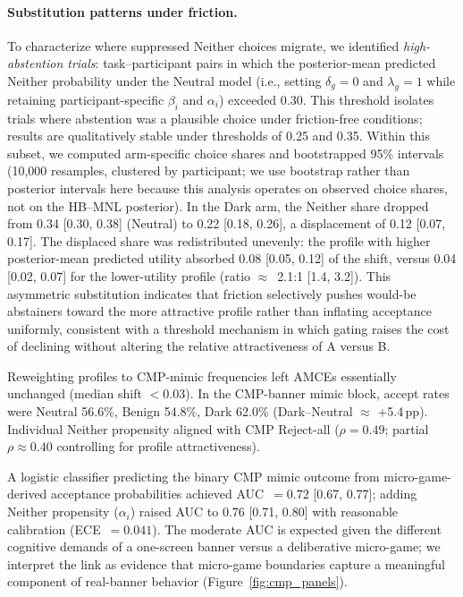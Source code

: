 \documentclass{eusset}
\begin{document}
\paragraph{Substitution patterns under friction.}
To characterize where suppressed Neither choices migrate, we identified \emph{high-abstention trials}: task--participant pairs in which the posterior-mean predicted Neither probability under the Neutral model (i.e., setting $\delta_g{=}0$ and $\lambda_g{=}1$ while retaining participant-specific $\beta_i$ and $\alpha_i$) exceeded 0.30. This threshold isolates trials where abstention was a plausible choice under friction-free conditions; results are qualitatively stable under thresholds of 0.25 and 0.35. Within this subset, we computed arm-specific choice shares and bootstrapped 95\% intervals (10{,}000 resamples, clustered by participant; we use bootstrap rather than posterior intervals here because this analysis operates on observed choice shares, not on the HB--MNL posterior). In the Dark arm, the Neither share dropped from 0.34 [0.30, 0.38] (Neutral) to 0.22 [0.18, 0.26], a displacement of 0.12 [0.07, 0.17]. The displaced share was redistributed unevenly: the profile with higher posterior-mean predicted utility absorbed 0.08 [0.05, 0.12] of the shift, versus 0.04 [0.02, 0.07] for the lower-utility profile (ratio $\approx$~2.1:1 [1.4, 3.2]). This asymmetric substitution indicates that friction selectively pushes would-be abstainers toward the more attractive profile rather than inflating acceptance uniformly, consistent with a threshold mechanism in which gating raises the cost of declining without altering the relative attractiveness of A versus B.

Reweighting profiles to CMP-mimic frequencies left AMCEs essentially unchanged (median shift $<0.03$). In the CMP-banner mimic block, accept rates were Neutral 56.6\%, Benign 54.8\%, Dark 62.0\% (Dark--Neutral $\approx$ +5.4\,pp). Individual Neither propensity aligned with CMP Reject-all ($\rho=0.49$; partial $\rho\approx 0.40$ controlling for profile attractiveness).


A logistic classifier predicting the binary CMP mimic outcome from micro-game-derived acceptance probabilities achieved AUC~$= 0.72$ [0.67, 0.77]; adding Neither propensity ($\alpha_i$) raised AUC to 0.76 [0.71, 0.80] with reasonable calibration (ECE~$= 0.041$). The moderate AUC is expected given the different cognitive demands of a one-screen banner versus a deliberative micro-game; we interpret the link as evidence that micro-game boundaries capture a meaningful component of real-banner behavior (Figure~\ref{fig:cmp_panels}).
\end{document}
